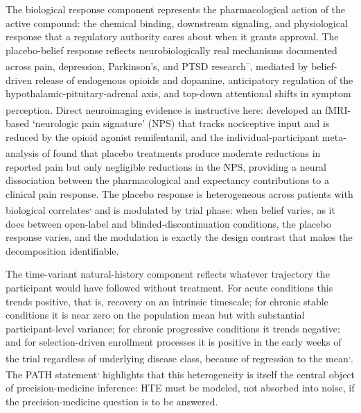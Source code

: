 \documentclass[
  11pt,
]{article}
\begin{document}
The biological response component represents the pharmacological action of the
active compound: the chemical binding, downstream signaling, and physiological
response that a regulatory authority cares about when it grants approval. The
placebo-belief response reflects neurobiologically real mechanisms documented
across pain, depression, Parkinson's, and PTSD research\textsuperscript{--}, mediated by belief-driven
release of endogenous opioids and dopamine, anticipatory regulation of the
hypothalamic-pituitary-adrenal axis, and top-down attentional shifts in
symptom perception. Direct neuroimaging evidence is instructive here:\textsuperscript{} developed an fMRI-based `neurologic pain signature' (NPS) that
tracks nociceptive input and is reduced by the opioid agonist remifentanil,
and the individual-participant meta-analysis of\textsuperscript{} found that
placebo treatments produce moderate reductions in reported pain but only
negligible reductions in the NPS, providing a neural dissociation between the
pharmacological and expectancy contributions to a clinical pain response. The
placebo response is heterogeneous across patients with biological correlates\textsuperscript{,} and is modulated by trial phase: when belief
varies, as it does between open-label and blinded-discontinuation conditions,
the placebo response varies, and the modulation is exactly the design contrast
that makes the decomposition identifiable.

The time-variant natural-history component reflects whatever trajectory the
participant would have followed without treatment. For acute conditions this
trends positive, that is, recovery on an intrinsic timescale; for chronic
stable conditions it is near zero on the population mean but with substantial
participant-level variance; for chronic progressive conditions it trends
negative; and for selection-driven enrollment processes it is positive in the
early weeks of the trial regardless of underlying disease class, because of
regression to the mean\textsuperscript{,}. The PATH
statement\textsuperscript{,} highlights that this heterogeneity
is itself the central object of precision-medicine inference: HTE must be
modeled, not absorbed into noise, if the precision-medicine question is to be
answered.
\end{document}
